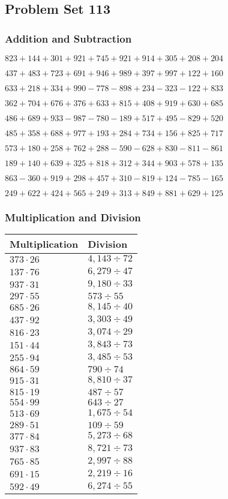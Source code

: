 \hypertarget{problem-set-113}{%
\subsection{Problem Set 113}\label{problem-set-113}}

\hypertarget{addition-and-subtraction}{%
\subsubsection{Addition and
Subtraction}\label{addition-and-subtraction}}

\(823 +144 +301 +921 +745 +921 +914 +305 +208 +204\)

\(437 +483 +723 +691 +946 +989 +397 +997 +122 +160\)

\(633 +218 +334 +990 - 778 - 898 +234 - 323 - 122 +833\)

\(362 +704 +676 +376 +633 +815 +408 +919 +630 +685\)

\(486 +689 +933 - 987 - 780 - 189 +517 +495 - 829 +520\)

\(485 +358 +688 +977 +193 +284 +734 +156 +825 +717\)

\(573 +180 +258 +762 +288 - 590 - 628 +830 - 811 - 861\)

\(189 +140 +639 +325 +818 +312 +344 +903 +578 +135\)

\(863 - 360 +919 +298 +457 +310 - 819 +124 - 785 - 165\)

\(249 +622 +424 +565 +249 +313 +849 +881 +629 +125\)

\hypertarget{multiplication-and-division}{%
\subsubsection{Multiplication and
Division}\label{multiplication-and-division}}

\begin{longtable}[]{@{}ll@{}}
\toprule
Multiplication & Division\tabularnewline
\midrule
\endhead
\(373 \cdot 26\) & \(4,143÷72\)\tabularnewline
\(137 \cdot 76\) & \(6,279÷47\)\tabularnewline
\(937 \cdot 31\) & \(9,180÷33\)\tabularnewline
\(297 \cdot 55\) & \(573÷55\)\tabularnewline
\(685 \cdot 26\) & \(8,145÷40\)\tabularnewline
\(437 \cdot 92\) & \(3,303÷49\)\tabularnewline
\(816 \cdot 23\) & \(3,074÷29\)\tabularnewline
\(151 \cdot 44\) & \(3,843÷73\)\tabularnewline
\(255 \cdot 94\) & \(3,485÷53\)\tabularnewline
\(864 \cdot 59\) & \(790÷74\)\tabularnewline
\(915 \cdot 31\) & \(8,810÷37\)\tabularnewline
\(815 \cdot 19\) & \(487÷57\)\tabularnewline
\(554 \cdot 99\) & \(643÷27\)\tabularnewline
\(513 \cdot 69\) & \(1,675÷54\)\tabularnewline
\(289 \cdot 51\) & \(109÷59\)\tabularnewline
\(377 \cdot 84\) & \(5,273÷68\)\tabularnewline
\(937 \cdot 83\) & \(8,721÷73\)\tabularnewline
\(765 \cdot 85\) & \(2,997÷88\)\tabularnewline
\(691 \cdot 15\) & \(2,219 ÷16\)\tabularnewline
\(592 \cdot 49\) & \(6,274÷55\)\tabularnewline
\bottomrule
\end{longtable}

